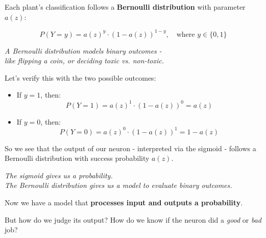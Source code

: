 \documentclass[11pt]{article}
\begin{document}
Each plant's classification follows a \textbf{Bernoulli distribution} with parameter $a(z)$:

\[
P(Y = y) = a(z)^y \cdot (1 - a(z))^{1 - y}, \quad \text{where } y \in \{0, 1\}
\]

\vspace{0.5em}

\begin{tcolorbox}[colback=gray!8, colframe=gray!40!black, sharp corners=southwest, boxrule=0.3mm]
\centering
\textit{A Bernoulli distribution models binary outcomes -}\\
\textit{like flipping a coin, or deciding toxic vs. non-toxic.}
\end{tcolorbox}

\vspace{1em}

Let's verify this with the two possible outcomes:

\begin{itemize}
    \item If $y = 1$, then:
    \[
    P(Y = 1) = a(z)^1 \cdot (1 - a(z))^0 = a(z)
    \]

    \item If $y = 0$, then:
    \[
    P(Y = 0) = a(z)^0 \cdot (1 - a(z))^1 = 1 - a(z)
    \]
\end{itemize}

\vspace{0.5em}

So we see that the output of our neuron - interpreted via the sigmoid - follows a Bernoulli distribution with success probability $a(z)$.

\vspace{1em}

\begin{tcolorbox}[colback=gray!8, colframe=gray!40!black, sharp corners=southwest, boxrule=0.3mm]
\centering
\textit{The sigmoid gives us a probability.}\\
\textit{The Bernoulli distribution gives us a model to evaluate binary outcomes.}
\end{tcolorbox}

\vspace{1.5em}

Now we have a model that \textbf{processes input and outputs a probability}.  

But how do we judge its output?  
How do we know if the neuron did a \textit{good} or \textit{bad} job?

\vspace{0.5em}
\end{document}
